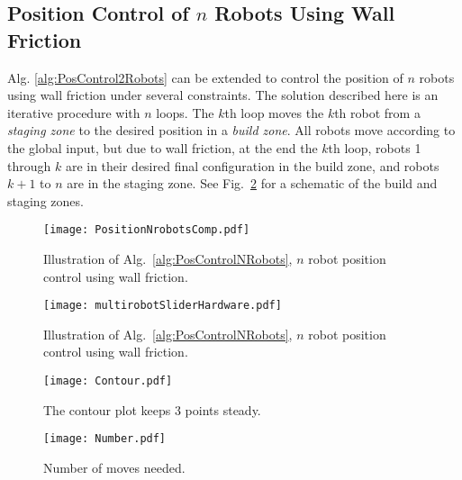 \subsection{Position Control of $n$ Robots Using Wall Friction}\label{sec:PostionControlnRobots}
Alg. \ref{alg:PosControl2Robots}  can be extended to control the position of $n$ robots using wall friction under several constraints. The solution described here is an iterative procedure with $n$ loops. The $k$th loop moves the $k$th robot from a \emph{staging zone} to the desired position in a \emph{build zone}. All robots move according to the global input, but due to wall friction, at the end the $k$th loop, robots 1 through $k$ are in their desired final configuration in the build zone, and robots $k+1$ to $n$ are in the staging zone. See Fig.~\ref{fig:construction2d} for a schematic of the build and staging zones.
\begin{figure}
\begin{center}
	\texttt{[image: PositionNrobotsComp.pdf]}
\end{center}
\vspace{-1em}
\caption{\label{fig:simulationNrobot}
Illustration of Alg.\ \ref{alg:PosControlNRobots}, $n$ robot position control  using wall friction.
}
\end{figure}

\begin{figure}
\begin{center}
	\texttt{[image: multirobotSliderHardware.pdf]}
\end{center}
\vspace{-1em}
\caption{\label{fig:construction2d}
Illustration of Alg.\ \ref{alg:PosControlNRobots}, $n$ robot position control  using wall friction.
}
\end{figure}

\begin{figure}
\begin{center}
	\texttt{[image: Contour.pdf]}
\end{center}
\vspace{-1em}
\caption{\label{fig:contour}
The contour plot keeps 3 points steady.
}
\end{figure}

\begin{figure}
\begin{center}
	\texttt{[image: Number.pdf]}
\end{center}
\vspace{-1em}
\caption{\label{fig:numberPlot}
Number of moves needed.
}
\end{figure}



